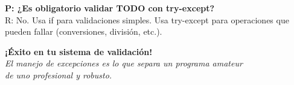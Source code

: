 \documentclass[12pt,a4paper]{article}
\begin{document}
\textbf{P: ¿Es obligatorio validar TODO con try-except?}\\
R: No. Usa if para validaciones simples. Usa try-except para operaciones que pueden fallar (conversiones, división, etc.).

\vspace{1cm}

\begin{center}
\textbf{¡Éxito en tu sistema de validación!}\\
\textit{El manejo de excepciones es lo que separa un programa amateur\\
de uno profesional y robusto.}
\end{center}
\end{document}

